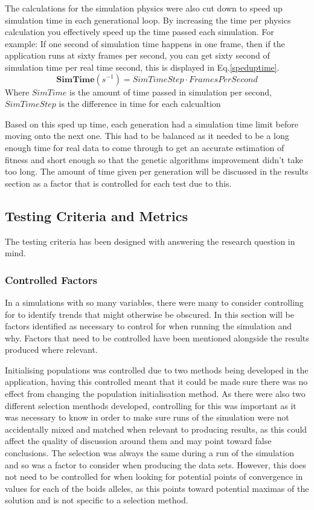 The calculations for the simulation physics were also cut down to speed up simulation time in each generational loop. By increasing the time per physics calculation you effectively speed up the time passed each simulation. For example: If one second of simulation time happens in one frame, then if the application runs at sixty frames per second, you can get sixty second of simulation time per real time second, this is displayed in Eq.\ref{speduptime}.
\begin{equation}
	\boldsymbol{SimTime}(s^{-1}) = SimTimeStep \cdot FramesPerSecond
	\label{speduptime}
\end{equation}
Where $SimTime$ is the amount of time passed in simulation per second, $SimTimeStep$ is the difference in time for each calcualtion

Based on this sped up time, each generation had a simulation time limit before moving onto the next one. This had to be balanced as it needed to be a long enough time for real data to come through to get an accurate estimation of fitness and short enough so that the genetic algorithms improvement didn't take too long. The amount of time given per generation will be discussed in the results section as a factor that is controlled for each test due to this.


\subsection{Testing Criteria and Metrics}
The testing criteria has been designed with answering the research question in mind. 

\subsubsection{Controlled Factors}
In a simulations with so many variables, there were many to consider controlling for to identify trends that might otherwise be obscured. In this section will be factors identified as necessary to control for when running the simulation and why. Factors that need to be controlled have been mentioned alongside the results produced where relevant.

Initialising populations was controlled due to two methods being developed in the application, having this controlled meant that it could be made sure there was no effect from changing the population initialisation method. As there were also two different selection menthods developed, controlling for this was important as it was necessary to know in order to make sure runs of the simulation were not accidentally mixed and matched when relevant to producing results, as this could affect the quality of discussion around them and may point toward false conclusions. The selection was always the same during a run of the simulation and so was a factor to consider when producing the data sets. However, this does not need to be controlled for when looking for potential points of convergence in values for each of the boids alleles, as this points toward potential maximas of the solution and is not specific to a selection method.

